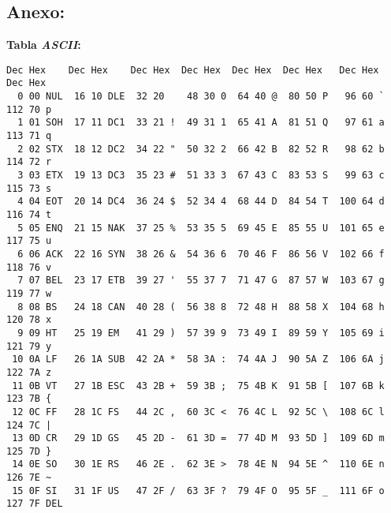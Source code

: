 \documentclass[12pt]{article}
\begin{document}
\subsection*{ \large\textbf{Anexo:} }

\textbf{Tabla \emph{ASCII}:}

\begin{verbatim}
Dec Hex    Dec Hex    Dec Hex  Dec Hex  Dec Hex  Dec Hex   Dec Hex   Dec Hex
  0 00 NUL  16 10 DLE  32 20    48 30 0  64 40 @  80 50 P   96 60 `  112 70 p
  1 01 SOH  17 11 DC1  33 21 !  49 31 1  65 41 A  81 51 Q   97 61 a  113 71 q
  2 02 STX  18 12 DC2  34 22 "  50 32 2  66 42 B  82 52 R   98 62 b  114 72 r
  3 03 ETX  19 13 DC3  35 23 #  51 33 3  67 43 C  83 53 S   99 63 c  115 73 s
  4 04 EOT  20 14 DC4  36 24 $  52 34 4  68 44 D  84 54 T  100 64 d  116 74 t
  5 05 ENQ  21 15 NAK  37 25 %  53 35 5  69 45 E  85 55 U  101 65 e  117 75 u
  6 06 ACK  22 16 SYN  38 26 &  54 36 6  70 46 F  86 56 V  102 66 f  118 76 v
  7 07 BEL  23 17 ETB  39 27 '  55 37 7  71 47 G  87 57 W  103 67 g  119 77 w
  8 08 BS   24 18 CAN  40 28 (  56 38 8  72 48 H  88 58 X  104 68 h  120 78 x
  9 09 HT   25 19 EM   41 29 )  57 39 9  73 49 I  89 59 Y  105 69 i  121 79 y
 10 0A LF   26 1A SUB  42 2A *  58 3A :  74 4A J  90 5A Z  106 6A j  122 7A z
 11 0B VT   27 1B ESC  43 2B +  59 3B ;  75 4B K  91 5B [  107 6B k  123 7B {
 12 0C FF   28 1C FS   44 2C ,  60 3C <  76 4C L  92 5C \  108 6C l  124 7C |
 13 0D CR   29 1D GS   45 2D -  61 3D =  77 4D M  93 5D ]  109 6D m  125 7D }
 14 0E SO   30 1E RS   46 2E .  62 3E >  78 4E N  94 5E ^  110 6E n  126 7E ~
 15 0F SI   31 1F US   47 2F /  63 3F ?  79 4F O  95 5F _  111 6F o  127 7F DEL
\end{verbatim}
\end{document}
